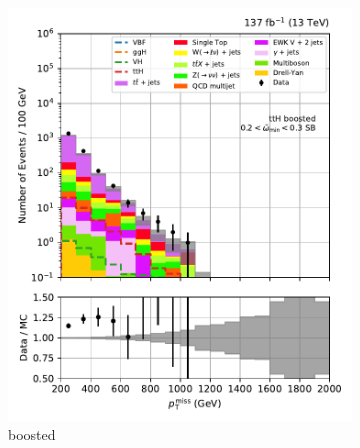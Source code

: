 \begin{figure}[htbp]
    \centering
    \begin{subfigure}[b]{0.24\textwidth}
        \includegraphics[width=\textwidth]{figures/region_plots/full_Run2/sideband_4/ttH_boosted.pdf}
        \caption{\ttH boosted}
    \end{subfigure}
    \hfill
    \begin{subfigure}[b]{0.24\textwidth}

\end{subfigure}
\end{figure}
